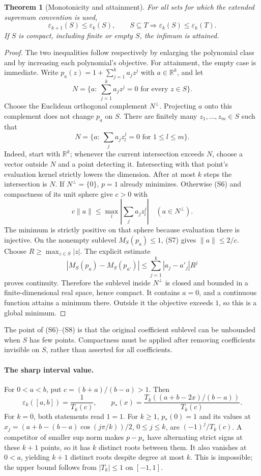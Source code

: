 \documentclass[11pt,a4paper]{article}
\newtheorem{theorem}{Theorem}[section]
\theoremstyle{definition}
\newcommand{\R}{\mathbb R}
\begin{document}
\begin{theorem}[Monotonicity and attainment]
For all sets for which the extended supremum convention is used,
\[
 \varepsilon_{k+1}(S)\le\varepsilon_k(S),\qquad
 S\subseteq T\Longrightarrow\varepsilon_k(S)\le\varepsilon_k(T).
\]
If $S$ is compact, including finite or empty $S$, the infimum is attained.
\end{theorem}
\begin{proof}
The two inequalities follow respectively by enlarging the polynomial
class and by increasing each polynomial's objective. For attainment,
the empty case is immediate. Write
$p_a(z)=1+\sum_{j=1}^k a_jz^j$ with $a\in\R^k$, and let
\[
 N=\{a:\ \sum_{j=1}^k a_jz^j=0\text{ for every }z\in S\}.
\]
Choose the Euclidean orthogonal complement $N^\perp$.
Projecting $a$ onto this complement does not change $p_a$ on $S$.
There are finitely many $z_1,\ldots,z_m\in S$ such that
\[
 N=\{a:\ \sum_j a_jz_l^j=0\text{ for }1\le l\le m\}.
 \tag{S6}
\]
Indeed, start with $\R^k$; whenever the current intersection exceeds
$N$, choose a vector outside $N$ and a point detecting it. Intersecting
with that point's evaluation kernel strictly lowers the dimension.
After at most $k$ steps the intersection is $N$.
If $N^\perp=\{0\}$, $p=1$ already minimizes. Otherwise (S6) and
compactness of its unit sphere give $c>0$ with
\[
 c\|a\|\le\max_l\left|\sum_j a_jz_l^j\right|
 \quad(a\in N^\perp).
 \tag{S7}
\]
The minimum is strictly positive on that sphere because evaluation
there is injective. On the nonempty sublevel $M_S(p_a)\le1$,
(S7) gives $\|a\|\le2/c$.
Choose $R\ge\max_{z\in S}|z|$. The explicit estimate
\[
 |M_S(p_a)-M_S(p_{a'})|
 \le\sum_{j=1}^k|a_j-a'_j|R^j
 \tag{S8}
\]
proves continuity. Therefore the sublevel inside $N^\perp$ is closed
and bounded in a finite-dimensional real space, hence compact.
It contains $a=0$, and a continuous function attains a minimum there.
Outside it the objective exceeds $1$, so this is a global minimum.
\end{proof}

The point of (S6)--(S8) is that the original coefficient sublevel can
be unbounded when $S$ has few points. Compactness must be applied
after removing coefficients invisible on $S$, rather than asserted
for all coefficients.

\paragraph{The sharp interval value.}
For $0<a<b$, put $c=(b+a)/(b-a)>1$. Then
\[
 \varepsilon_k([a,b])=\frac1{T_k(c)},\qquad
 p_*(x)=\frac{T_k((a+b-2x)/(b-a))}{T_k(c)}.
 \tag{S9}
\]
For $k=0$, both statements read $1=1$.
For $k\ge1$, $p_*(0)=1$ and its values at
$x_j=(a+b-(b-a)\cos(j\pi/k))/2$, $0\le j\le k$, are
$(-1)^j/T_k(c)$. A competitor of smaller sup norm makes
$p-p_*$ have alternating strict signs at these $k+1$ points,
so it has $k$ distinct roots between them. It also vanishes at
$0<a$, yielding $k+1$ distinct roots despite degree at most $k$.
This is impossible; the upper bound follows from $|T_k|\le1$ on
$[-1,1]$.
\end{document}
